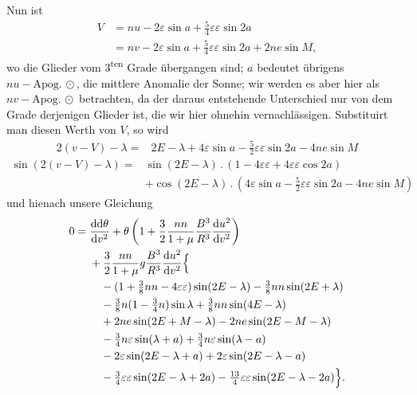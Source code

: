 \par\noindent\hspace*{\parindent}Nun ist
\[
\begin{aligned}
V&=nu-2\varepsilon\sin a+\tfrac54\varepsilon\varepsilon\sin2a\\
 &=nv-2\varepsilon\sin a+\tfrac54\varepsilon\varepsilon\sin2a+2ne\sin M,
\end{aligned}
\]
\noindent wo die Glieder vom 3\textsuperscript{ten} Grade übergangen sind;
\(a\) bedeutet übrigens \(nu-\mathrm{Apog.}\,\odot\), die mittlere Anomalie der Sonne;
wir werden es aber hier als \(nv-\mathrm{Apog.}\,\odot\) betrachten, da der daraus
entstehende Unterschied nur von dem Grade derjenigen Glieder ist, die wir
hier ohnehin vernachlässigen. Substituirt man diesen Werth von \(V\), so wird
\[
\begin{aligned}
2(v-V)-\lambda={}&2E-\lambda+4\varepsilon\sin a
-\tfrac52\varepsilon\varepsilon\sin2a-4ne\sin M
\end{aligned}
\]
\[
\begin{aligned}
\sin(2(v-V)-\lambda)={}&\sin(2E-\lambda)\mathbin{.}
(1-4\varepsilon\varepsilon+4\varepsilon\varepsilon\cos2a)\\
&+\cos(2E-\lambda)\mathbin{.}
(4\varepsilon\sin a-\tfrac52\varepsilon\varepsilon\sin2a-4ne\sin M)
\end{aligned}
\]
\noindent und hienach unsere Gleichung
\clearpage{}\thispagestyle{VIIPrinted627}
\[
\begin{aligned}
0={}&\frac{\mathrm{dd}\theta}{\mathrm{d}v^2}
+\theta\left(1+\frac32\frac{nn}{1+\mu}\frac{B^3}{R^3}
\frac{\mathrm{d}u^2}{\mathrm{d}v^2}\right)\\
&+\frac32\frac{nn}{1+\mu}g\frac{B^3}{R^3}\frac{\mathrm{d}u^2}{\mathrm{d}v^2}\Bigl\{\\
&\quad -(1+\tfrac38nn-4\varepsilon\varepsilon)\sin(2E-\lambda)
-\tfrac38nn\sin(2E+\lambda)\\
&\quad -\tfrac38n(1-\tfrac34n)\sin\lambda+\tfrac38nn\sin(4E-\lambda)\\
&\quad +2ne\sin(2E+M-\lambda)-2ne\sin(2E-M-\lambda)\\
&\quad -\tfrac34n\varepsilon\sin(\lambda+a)+\tfrac34n\varepsilon\sin(\lambda-a)\\
&\quad -2\varepsilon\sin(2E-\lambda+a)+2\varepsilon\sin(2E-\lambda-a)\\
&\quad -\tfrac34\varepsilon\varepsilon\sin(2E-\lambda+2a)
-\tfrac{13}{4}\varepsilon\varepsilon\sin(2E-\lambda-2a)\Bigr\}.
\end{aligned}
\]
